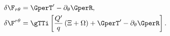 \begin{equation}
\begin{aligned}
\delta \F_{r \theta} & = \GperT' - \partial_\theta \GperR,\\ \delta
\F^{r \theta} & = \gTTi \left[\frac{Q'}{q} \left(\Xi + \Omega \right)
+ \GperT' - \partial_\theta \GperR \right].
\end{aligned}
\end{equation}

